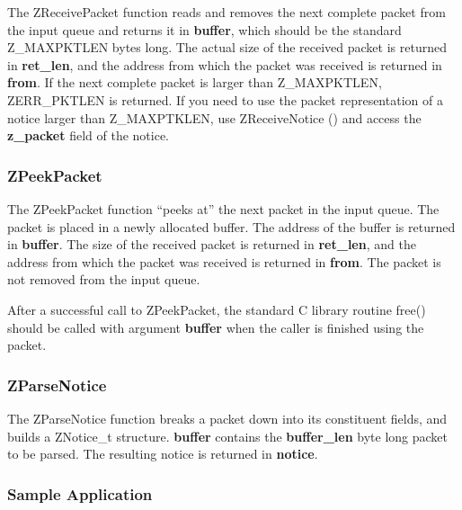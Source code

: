The ZReceivePacket function reads and removes the next complete packet from the
input queue and returns it in {\bf buffer}, which should be the standard
Z_MAXPKTLEN bytes long.  The actual size of the received packet is returned in
{\bf *ret_len}, and the address from which the packet was received is
returned in {\bf *from}.  If the next complete packet is larger than
Z_MAXPKTLEN, ZERR_PKTLEN is returned.
If you need to use the packet representation of a notice larger than
Z_MAXPTKLEN, use ZReceiveNotice () and access the
{\bf z_packet} field of the notice.

\subsubsection{ZPeekPacket}
\label{ZPeekPacket}

\etemplate
{}

The ZPeekPacket function ``peeks at'' the next packet in the input
queue.  The packet is placed in a newly allocated buffer.  The address
of the buffer is returned in {\bf *buffer}.  The size of the received
packet is returned in {\bf *ret_len}, and the address from which the
packet was received is returned in {\bf *from}.  The packet is not
removed from the input queue.

After a successful call to ZPeekPacket, the standard C library routine
free() should be called with argument {\bf *buffer} when the caller is
finished using the packet.

\subsubsection{ZParseNotice}
\label{ZParseNotice}

\etemplate
{}

The ZParseNotice function breaks a packet down into its constituent
fields, and builds a ZNotice_t structure.  {\bf buffer} contains the
{\bf buffer_len} byte long packet to be parsed.  The resulting notice is
returned in {\bf *notice}.

\subsubsection{Sample Application}

